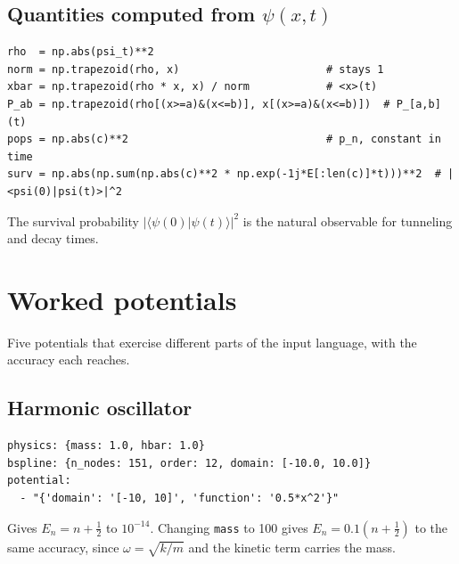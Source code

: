 \documentclass[11pt]{article}
\newcommand{\braket}[2]{\langle #1 | #2 \rangle}
\begin{document}
\subsection{Quantities computed from \texorpdfstring{$\psi(x,t)$}{psi(x,t)}}

\begin{lstlisting}[style=py]
rho  = np.abs(psi_t)**2
norm = np.trapezoid(rho, x)                       # stays 1
xbar = np.trapezoid(rho * x, x) / norm            # <x>(t)
P_ab = np.trapezoid(rho[(x>=a)&(x<=b)], x[(x>=a)&(x<=b)])  # P_[a,b](t)
pops = np.abs(c)**2                               # p_n, constant in time
surv = np.abs(np.sum(np.abs(c)**2 * np.exp(-1j*E[:len(c)]*t)))**2  # |<psi(0)|psi(t)>|^2
\end{lstlisting}

The survival probability $|\braket{\psi(0)}{\psi(t)}|^{2}$ is the natural
observable for tunneling and decay times.

\section{Worked potentials}
\label{sec:examples}

Five potentials that exercise different parts of the input language, with the
accuracy each reaches.

\subsection*{Harmonic oscillator}
\begin{lstlisting}[style=yaml]
physics: {mass: 1.0, hbar: 1.0}
bspline: {n_nodes: 151, order: 12, domain: [-10.0, 10.0]}
potential:
  - "{'domain': '[-10, 10]', 'function': '0.5*x^2'}"
\end{lstlisting}
Gives $E_n = n + \tfrac12$ to $10^{-14}$. Changing \texttt{mass} to 100 gives
$E_n = 0.1(n+\tfrac12)$ to the same accuracy, since $\omega = \sqrt{k/m}$ and
the kinetic term carries the mass.
\end{document}
